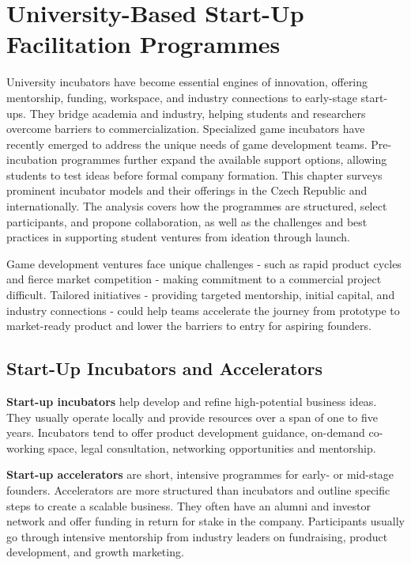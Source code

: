 \chapter{University-Based Start-Up Facilitation Programmes}

\begin{chapterabstract}
    University incubators have become essential engines of innovation, offering mentorship, funding, workspace, and industry connections to early-stage start-ups. They bridge academia and industry, helping students and researchers overcome barriers to commercialization. Specialized game incubators have recently emerged to address the unique needs of game development teams. Pre-incubation programmes further expand the available support options, allowing students to test ideas before formal company formation. This chapter surveys prominent incubator models and their offerings in the Czech Republic and internationally. The analysis covers how the programmes are structured, select participants, and propone collaboration, as well as the challenges and best practices in supporting student ventures from ideation through launch.    
\end{chapterabstract}

Game development ventures face unique challenges - such as rapid product cycles and fierce market competition - making commitment to a commercial project difficult. Tailored initiatives - providing targeted mentorship, initial capital, and industry connections - could help teams accelerate the journey from prototype to market-ready product and lower the barriers to entry for aspiring founders.

\section{Start-Up Incubators and Accelerators}
\textbf{Start-up incubators} help develop and refine high-potential business ideas. They usually operate locally and provide resources over a span of one to five years. Incubators tend to offer product development guidance, on-demand co-working space, legal consultation, networking opportunities and mentorship.

\textbf{Start-up accelerators} are short, intensive programmes for early- or mid-stage founders. Accelerators are more structured than incubators and outline specific steps to create a scalable business. They often have an alumni and investor network and offer funding in return for stake in the company. Participants usually go through intensive mentorship from industry leaders on fundraising, product development, and growth marketing.

